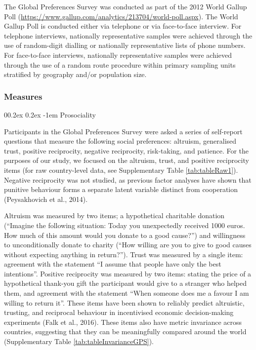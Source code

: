 \documentclass[
  man,floatsintext]{apa6}
\makeatletter
\let\oldparagraph\paragraph
\renewcommand{\paragraph}[1]{\oldparagraph{#1}\mbox{}}
\renewcommand{\paragraph}{\@startsection{paragraph}{4}{\parindent}%
  {0\baselineskip \@plus 0.2ex \@minus 0.2ex}%
  {-1em}%
  {\normalfont\normalsize\bfseries\itshape\typesectitle}}
\makeatother
\begin{document}
The Global Preferences Survey was conducted as part of the 2012 World Gallup Poll (\url{https://www.gallup.com/analytics/213704/world-poll.aspx}). The World Gallup Poll is conducted either via telephone or via face-to-face interview. For telephone interviews, nationally representative samples were achieved through the use of random-digit dialling or nationally representative lists of phone numbers. For face-to-face interviews, nationally representative samples were achieved through the use of a random route procedure within primary sampling units stratified by geography and/or population size.

\hypertarget{measures}{%
\subsubsection{Measures}\label{measures}}

\hypertarget{prosociality}{%
\paragraph{Prosociality}\label{prosociality}}

Participants in the Global Preferences Survey were asked a series of self-report questions that measure the following social preferences: altruism, generalised trust, positive reciprocity, negative reciprocity, risk-taking, and patience. For the purposes of our study, we focused on the altruism, trust, and positive reciprocity items (for raw country-level data, see Supplementary Table \ref{tab:tableRaw1}). Negative reciprocity was not studied, as previous factor analyses have shown that punitive behaviour forms a separate latent variable distinct from cooperation (Peysakhovich et al., 2014).

Altruism was measured by two items; a hypothetical charitable donation (``Imagine the following situation: Today you unexpectedly received 1000 euros. How much of this amount would you donate to a good cause?'') and willingness to unconditionally donate to charity (``How willing are you to give to good causes without expecting anything in return?''). Trust was measured by a single item: agreement with the statement ``I assume that people have only the best intentions''. Positive reciprocity was measured by two items: stating the price of a hypothetical thank-you gift the participant would give to a stranger who helped them, and agreement with the statement ``When someone does me a favour I am willing to return it''. These items have been shown to reliably predict altruistic, trusting, and reciprocal behaviour in incentivised economic decision-making experiments (Falk et al., 2016). These items also have metric invariance across countries, suggesting that they can be meaningfully compared around the world (Supplementary Table \ref{tab:tableInvarianceGPS}).
\end{document}
